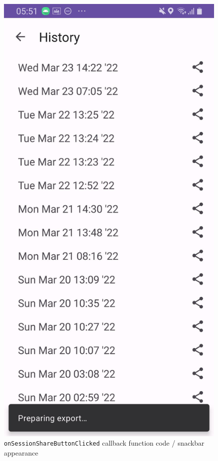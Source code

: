 \documentclass[11pt,twoside,a4paper]{report}
\begin{document}
\begin{figure}[h!]
  \includegraphics[height=0.4\textheight]{snackbar.jpg}
  \caption{\texttt{onSessionShareButtonClicked} callback function code / snackbar appearance}
  \label{fig:onSessionShareButtonClicked}
\end{figure}
\end{document}
